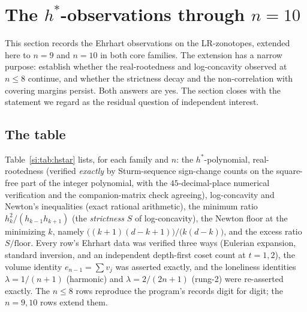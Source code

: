 
\section{The \boldmath$h^*$-observations through \boldmath$n=10$}
\label{si:sec:hstar}

This section records the Ehrhart observations on the LR-zonotopes,
extended here to $n=9$ and $n=10$ in both core families. The
extension has a narrow purpose:
establish whether the real-rootedness and log-concavity observed at
$n\le8$ continue, and whether the strictness decay and the
non-correlation with covering margins persist. Both answers are yes. The
section closes with the statement we regard as the residual question of
independent interest.

\subsection{The table}

Table~\ref{si:tab:hstar} lists, for each family and $n$: the
$h^*$-polynomial, real-rootedness (verified \emph{exactly} by
Sturm-sequence sign-change counts on the square-free part of the integer
polynomial, with the $45$-decimal-place numerical verification and
the companion-matrix check agreeing), log-concavity and Newton's inequalities (exact rational
arithmetic), the minimum ratio $h_k^2/(h_{k-1}h_{k+1})$ (the
\emph{strictness} $S$ of log-concavity), the Newton floor at the
minimizing $k$, namely
$\bigl((k{+}1)(d{-}k{+}1)\bigr)/\bigl(k(d{-}k)\bigr)$,
and the excess ratio $S/\text{floor}$. Every row's Ehrhart data was
verified three ways (Eulerian expansion, standard inversion, and an
independent depth-first coset count at $t=1,2$), the volume identity
$e_{n-1}=\sum v_j$ was asserted exactly, and the loneliness identities
$\lambda=1/(n{+}1)$ (harmonic) and $\lambda=2/(2n{+}1)$ (rung-2) were
re-asserted exactly. The $n\le8$ rows reproduce the program's
records digit for digit; the $n=9,10$ rows extend them.

